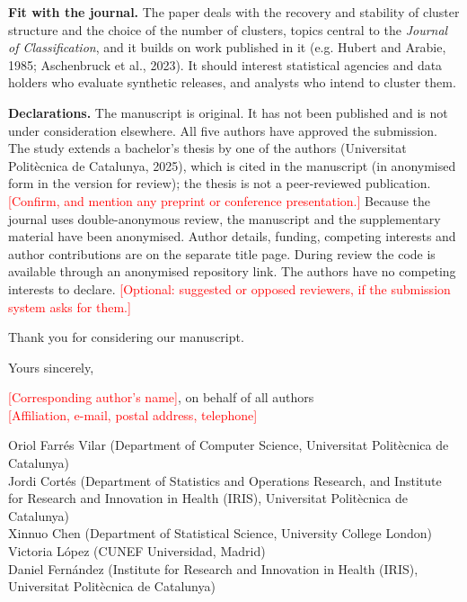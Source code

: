 \documentclass[10pt,a4paper]{article}
\begin{document}
\textbf{Fit with the journal.} The paper deals with the recovery and stability of cluster structure and the choice of the number of clusters, topics central to the \emph{Journal of Classification}, and it builds on work published in it (e.g. Hubert and Arabie, 1985; Aschenbruck et al., 2023). It should interest statistical agencies and data holders who evaluate synthetic releases, and analysts who intend to cluster them.

\textbf{Declarations.} The manuscript is original. It has not been published and is not under consideration elsewhere. All five authors have approved the submission. The study extends a bachelor's thesis by one of the authors (Universitat Politècnica de Catalunya, 2025), which is cited in the manuscript (in anonymised form in the version for review); the thesis is not a peer-reviewed publication. \textcolor{red}{[Confirm, and mention any preprint or conference presentation.]} Because the journal uses double-anonymous review, the manuscript and the supplementary material have been anonymised. Author details, funding, competing interests and author contributions are on the separate title page. During review the code is available through an anonymised repository link. The authors have no competing interests to declare. \textcolor{red}{[Optional: suggested or opposed reviewers, if the submission system asks for them.]}

Thank you for considering our manuscript.

Yours sincerely,

\textcolor{red}{[Corresponding author's name]}, on behalf of all authors\\
\textcolor{red}{[Affiliation, e-mail, postal address, telephone]}

Oriol Farrés Vilar (Department of Computer Science, Universitat Politècnica de Catalunya)\\
Jordi Cortés (Department of Statistics and Operations Research, and Institute for Research and Innovation in Health (IRIS), Universitat Politècnica de Catalunya)\\
Xinnuo Chen (Department of Statistical Science, University College London)\\
Victoria López (CUNEF Universidad, Madrid)\\
Daniel Fernández (Institute for Research and Innovation in Health (IRIS), Universitat Politècnica de Catalunya)
\end{document}
